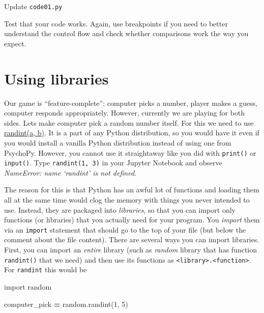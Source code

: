 \documentclass[
]{book}
\newenvironment{Shaded}{\begin{snugshade}}{\end{snugshade}}
\newcommand{\DecValTok}[1]{\textcolor[rgb]{0.00,0.00,0.81}{#1}}
\newcommand{\ImportTok}[1]{#1}
\newcommand{\NormalTok}[1]{#1}
\newcommand{\OperatorTok}[1]{\textcolor[rgb]{0.81,0.36,0.00}{\textbf{#1}}}
\begin{document}
Update \texttt{code01.py}

Test that your code works. Again, use breakpoints if you need to better understand the control flow and check whether comparisons work the way you expect.

\hypertarget{using-libraries}{%
\section{Using libraries}\label{using-libraries}}

Our game is ``feature-complete'': computer picks a number, player makes a guess, computer responds appropriately. However, currently we are playing for both sides. Lets make computer pick a random number itself. For this we need to use \href{https://docs.python.org/3/library/random.html\#random.randint}{randint(a, b)}. It is a part of any Python distribution, so you would have it even if you would install a vanilla Python distribution instead of using one from PsychoPy. However, you cannot use it straightaway like you did with \texttt{print()} or \texttt{input()}. Type \texttt{randint(1,\ 3)} in your Jupyter Notebook and observe \emph{NameError: name `randint' is not defined}.

The reason for this is that Python has an awful lot of functions and loading them all at the same time would clog the memory with things you never intended to use. Instead, they are packaged into \emph{libraries}, so that you can import only functions (or libraries) that you actually need for your program. You \emph{import} them via an \texttt{import} statement that should go to the top of your file (but below the comment about the file content). There are several ways you can import libraries. First, you can import an \emph{entire} library (such as \emph{random} library that has function \texttt{randint()} that we need) and then use its functions as \texttt{\textless{}library\textgreater{}.\textless{}function\textgreater{}}. For \texttt{randint} this would be

\begin{Shaded}
\begin{Highlighting}[]
\ImportTok{import}\NormalTok{ random}

\NormalTok{computer\_pick }\OperatorTok{=}\NormalTok{ random.randint(}\DecValTok{1}\NormalTok{, }\DecValTok{5}\NormalTok{)}
\end{Highlighting}
\end{Shaded}
\end{document}
